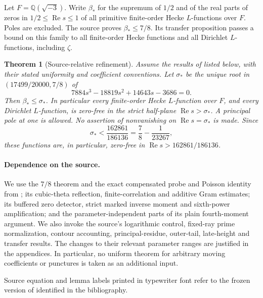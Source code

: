 \documentclass[11pt,a4paper]{article}
\numberwithin{equation}{section}
\newtheorem{theorem}{Theorem}[section]
\theoremstyle{remark}
\newcommand{\Rea}{\operatorname{Re}}
\begin{document}
Let $F=\mathbb Q(\sqrt{-3})$. Write $\beta_*$ for the supremum of
$1/2$ and of the real parts of zeros in $1/2\le\Rea s\le1$ of all
primitive finite-order Hecke $L$-functions over $F$. Poles are excluded.
The source \cite{OA} proves $\beta_*\le7/8$. Its transfer proposition
passes a bound on this family to all finite-order Hecke functions and
all Dirichlet $L$-functions, including $\zeta$.

\begin{theorem}[Source-relative refinement]\label{thm:main-refinement}
Assume the results of \cite{OA} listed below, with their stated
uniformity and coefficient conventions. Let $\sigma_*$ be the unique
root in $(17499/20000,7/8)$ of
\begin{equation}\label{eq:main-cubic}
 7884s^3-18819s^2+14643s-3686=0.
\end{equation}
Then $\beta_*\le\sigma_*$. In particular every finite-order Hecke
$L$-function over $F$, and every Dirichlet $L$-function, is zero-free
in the strict half-plane $\Rea s>\sigma_*$. A principal pole at one
is allowed. No assertion of nonvanishing on $\Rea s=\sigma_*$ is made.
Since
\begin{equation}\label{eq:main-rational}
 \sigma_*<\frac{162861}{186136}=\frac78-\frac1{23267},
\end{equation}
these functions are, in particular, zero-free in
$\Rea s>162861/186136$.
\end{theorem}

\paragraph{Dependence on the source.}
We use the $7/8$ theorem and the exact compensated probe and Poisson
identity from \cite{OA}; its cubic-theta reflection, finite-correlation
and additive Gram estimates; its buffered zero detector, strict marked
inverse moment and sixth-power amplification; and the parameter-independent
parts of its plain fourth-moment argument. We also invoke the source's
logarithmic control, fixed-ray prime normalization, contour accounting,
principal-residue, outer-tail, late-height and transfer results. The
changes to their relevant parameter ranges are justified in the appendices.
In particular, no uniform theorem for arbitrary moving coefficients or
punctures is taken as an additional input.

Source equation and lemma labels printed in typewriter font refer to the
frozen version of \cite{OA} identified in the bibliography.
\end{document}
